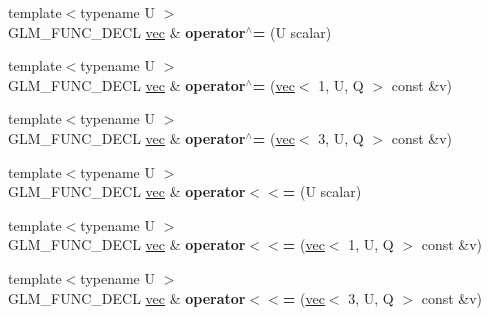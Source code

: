 \begin{DoxyCompactItemize}
\item 
\mbox{\label{structglm_1_1vec_3_013_00_01T_00_01Q_01_4_a697cfaf1caf704ec84ecee6a5677b2c8}} 
{\footnotesize template$<$typename U $>$ }\\G\+L\+M\+\_\+\+F\+U\+N\+C\+\_\+\+D\+E\+CL \hyperlink{structglm_1_1vec}{vec} \& {\bfseries operator$^\wedge$=} (U scalar)
\item 
\mbox{\label{structglm_1_1vec_3_013_00_01T_00_01Q_01_4_a9499879dc0557fa6b4ad14cd6a1372b9}} 
{\footnotesize template$<$typename U $>$ }\\G\+L\+M\+\_\+\+F\+U\+N\+C\+\_\+\+D\+E\+CL \hyperlink{structglm_1_1vec}{vec} \& {\bfseries operator$^\wedge$=} (\hyperlink{structglm_1_1vec}{vec}$<$ 1, U, Q $>$ const \&v)
\item 
\mbox{\label{structglm_1_1vec_3_013_00_01T_00_01Q_01_4_a8dd8004cf0cab42517c2cb6cb7f18461}} 
{\footnotesize template$<$typename U $>$ }\\G\+L\+M\+\_\+\+F\+U\+N\+C\+\_\+\+D\+E\+CL \hyperlink{structglm_1_1vec}{vec} \& {\bfseries operator$^\wedge$=} (\hyperlink{structglm_1_1vec}{vec}$<$ 3, U, Q $>$ const \&v)
\item 
\mbox{\label{structglm_1_1vec_3_013_00_01T_00_01Q_01_4_ab07f795306e494f77fd34b9540161461}} 
{\footnotesize template$<$typename U $>$ }\\G\+L\+M\+\_\+\+F\+U\+N\+C\+\_\+\+D\+E\+CL \hyperlink{structglm_1_1vec}{vec} \& {\bfseries operator$<$$<$=} (U scalar)
\item 
\mbox{\label{structglm_1_1vec_3_013_00_01T_00_01Q_01_4_a1325fb6cc79d8e3676e9b2be79c20df3}} 
{\footnotesize template$<$typename U $>$ }\\G\+L\+M\+\_\+\+F\+U\+N\+C\+\_\+\+D\+E\+CL \hyperlink{structglm_1_1vec}{vec} \& {\bfseries operator$<$$<$=} (\hyperlink{structglm_1_1vec}{vec}$<$ 1, U, Q $>$ const \&v)
\item 
\mbox{\label{structglm_1_1vec_3_013_00_01T_00_01Q_01_4_aad0c7ea72dfec6224b1a5cabeea950fb}} 
{\footnotesize template$<$typename U $>$ }\\G\+L\+M\+\_\+\+F\+U\+N\+C\+\_\+\+D\+E\+CL \hyperlink{structglm_1_1vec}{vec} \& {\bfseries operator$<$$<$=} (\hyperlink{structglm_1_1vec}{vec}$<$ 3, U, Q $>$ const \&v)

\end{DoxyCompactItemize}

